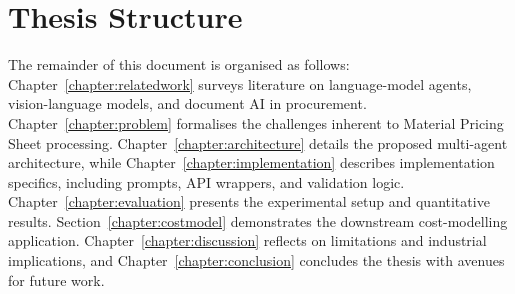 \section{Thesis Structure }
The remainder of this document is organised as follows:  
Chapter~\ref{chapter:relatedwork} surveys literature on language-model agents, vision-language models, and document AI in procurement.  
Chapter~\ref{chapter:problem} formalises the challenges inherent to Material Pricing Sheet processing.  
Chapter~\ref{chapter:architecture} details the proposed multi-agent architecture, while Chapter~\ref{chapter:implementation} describes implementation specifics, including prompts, API wrappers, and validation logic.  
Chapter~\ref{chapter:evaluation} presents the experimental setup and quantitative results.  
Section~\ref{chapter:costmodel} demonstrates the downstream cost-modelling application.  
Chapter~\ref{chapter:discussion} reflects on limitations and industrial implications, and Chapter~\ref{chapter:conclusion} concludes the thesis with avenues for future work.
